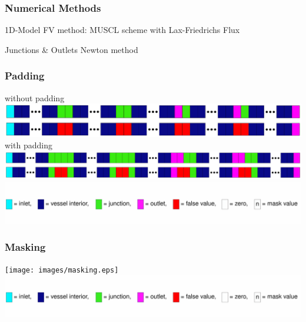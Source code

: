 \documentclass{beamer}
\begin{document}
%
%
\begin{frame}
	\frametitle{Numerical Methods}
	\begin{block}{1D-Model}
		FV method: MUSCL scheme with Lax-Friedrichs Flux
	\end{block}
	\begin{block}{Junctions \& Outlets}
		Newton method
	\end{block}
\end{frame}
\begin{frame}
	\frametitle{Padding}
	without padding
	\includegraphics[width=\textwidth]{images/padding1.eps}
	with padding
	\includegraphics[width=\textwidth]{images/padding2.eps}
	\includegraphics[width=\textwidth]{images/legend.eps}
\end{frame}
\begin{frame}
	\frametitle{Masking}
	\texttt{[image: images/masking.eps]}
	\includegraphics[width=\textwidth]{images/legend.eps}
\end{frame}
\end{document}
